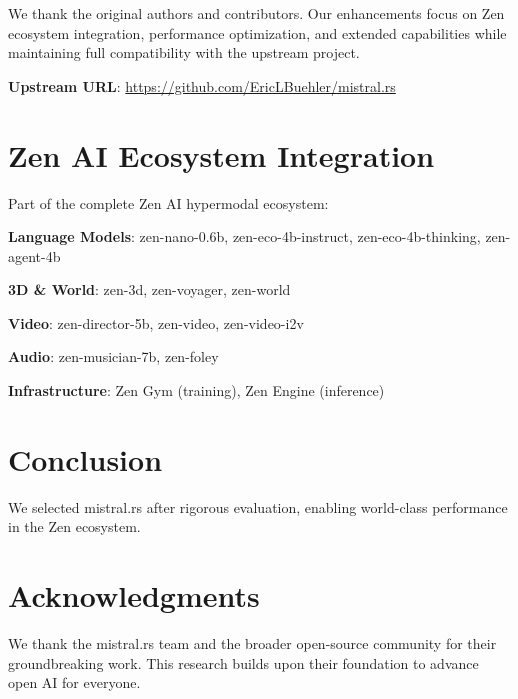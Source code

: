 \documentclass[11pt,a4paper]{article}
\begin{document}
We thank the original authors and contributors. Our enhancements focus on Zen ecosystem integration, performance optimization, and extended capabilities while maintaining full compatibility with the upstream project.

\textbf{Upstream URL}: \url{https://github.com/EricLBuehler/mistral.rs}

\section{Zen AI Ecosystem Integration}

Part of the complete Zen AI hypermodal ecosystem:

\textbf{Language Models}: zen-nano-0.6b, zen-eco-4b-instruct, zen-eco-4b-thinking, zen-agent-4b

\textbf{3D \& World}: zen-3d, zen-voyager, zen-world

\textbf{Video}: zen-director-5b, zen-video, zen-video-i2v

\textbf{Audio}: zen-musician-7b, zen-foley

\textbf{Infrastructure}: Zen Gym (training), Zen Engine (inference)

\section{Conclusion}
We selected mistral.rs after rigorous evaluation, enabling world-class performance in the Zen ecosystem.

\section*{Acknowledgments}
We thank the mistral.rs team and the broader open-source community for their groundbreaking work. This research builds upon their foundation to advance open AI for everyone.



\end{document}
